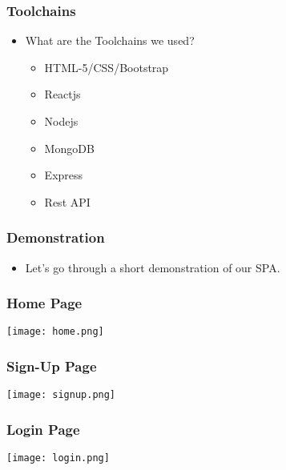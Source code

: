 \documentclass[12pt]{beamer}
\begin{document}
  
\begin{frame}
    \frametitle{Toolchains}
    \begin{itemize}          
        \item What are the Toolchains we used?
             \begin{itemize}
             \item { HTML-5/CSS/Bootstrap } 
      		 
      		 \item { Reactjs } 
      		 \item { Nodejs } 
             \item { MongoDB }
             \item{Express}
             \item { Rest API }
             
             \end{itemize}
             
       
    \end{itemize}       
\end{frame}  

\begin{frame}
    \frametitle{Demonstration} 
    \begin{itemize}          
        \item {Let’s go through a short demonstration of our SPA.}                       
    \end{itemize}       
\end{frame}   
   
   
\begin{frame}  
  \frametitle{Home Page}      
      \begin {center}
         \texttt{[image: home.png]} 
      \end{center}   
\end{frame}   

\begin{frame}  
  \frametitle{Sign-Up Page}      
      \begin {center}
         \texttt{[image: signup.png]} 
      \end{center}   
\end{frame}  

\begin{frame}  
  \frametitle{Login Page}      
      \begin {center}
         \texttt{[image: login.png]} 
      \end{center}   
\end{frame}  
\end{document}
